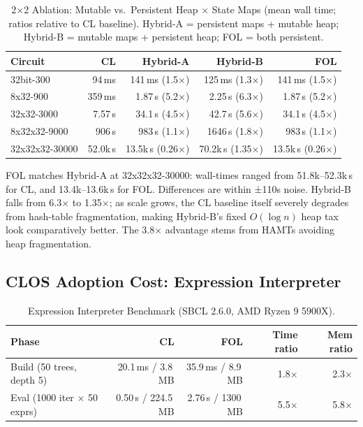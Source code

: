 \documentclass[sigconf,nonacm]{acmart}
\begin{document}
\begin{table}[htbp]
\small
\caption{2$\times$2 Ablation: Mutable vs.\ Persistent Heap $\times$ State Maps (mean wall time; ratios relative to CL baseline). Hybrid-A = persistent maps + mutable heap; Hybrid-B = mutable maps + persistent heap; FOL = both persistent.}
\label{tab:lsim-ablation}
\begin{tabular}{lrrrr}
\toprule
\textbf{Circuit} & \textbf{CL} & \textbf{Hybrid-A} & \textbf{Hybrid-B} & \textbf{FOL} \\
\midrule
32bit-300    & 94\,ms & 141\,ms (1.5$\times$) & 125\,ms (1.3$\times$) & 141\,ms (1.5$\times$) \\
8x32-900     & 359\,ms  & 1.87\,s (5.2$\times$) & 2.25\,s (6.3$\times$) & 1.87\,s (5.2$\times$) \\
32x32-3000   & 7.57\,s  & 34.1\,s (4.5$\times$) & 42.7\,s (5.6$\times$) & 34.1\,s (4.5$\times$) \\
8x32x32-9000 & 906\,s   & 983\,s  (1.1$\times$) & 1646\,s (1.8$\times$) & 983\,s  (1.1$\times$) \\
32x32x32-30000 & 52.0k\,s & 13.5k\,s (0.26$\times$) & 70.2k\,s (1.35$\times$) & 13.5k\,s (0.26$\times$) \\
\bottomrule
\end{tabular}
\end{table}

FOL matches Hybrid-A at 32x32x32-30000: wall-times ranged from 51.8k--52.3k\,s for CL, and 13.4k--13.6k\,s for FOL.
Differences are within ±110s noise. Hybrid-B falls from 6.3$\times$ to 1.35$\times$; as scale grows, the CL baseline itself severely degrades from hash-table fragmentation,
making Hybrid-B's fixed $O(\log n)$ heap tax look comparatively better. The 3.8$\times$ advantage stems from HAMTs avoiding heap fragmentation.

\subsection{CLOS Adoption Cost: Expression Interpreter}
\label{sec:interp-bench}

\begin{table}[t]
\small
\caption{Expression Interpreter Benchmark (SBCL 2.6.0, AMD Ryzen 9 5900X).}
\label{tab:interp-perf}
\begin{tabular}{lrrrr}
\toprule
\textbf{Phase} & \textbf{CL} & \textbf{FOL} & \textbf{Time ratio} & \textbf{Mem ratio} \\
\midrule
Build (50 trees, depth 5) & 20.1\,ms / 3.8\,MB & 35.9\,ms / 8.9\,MB & 1.8$\times$ & 2.3$\times$ \\
Eval (1000 iter $\times$ 50 exprs) & 0.50\,s / 224.5\,MB & 2.76\,s / 1300\,MB & 5.5$\times$ & 5.8$\times$ \\
\bottomrule
\end{tabular}
\end{table}
\end{document}
